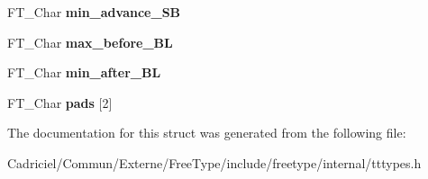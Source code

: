 \begin{DoxyCompactItemize}
\item 
F\+T\+\_\+\+Char {\bfseries min\+\_\+advance\+\_\+\+SB}\hypertarget{struct_t_t___s_bit___line_metrics_rec___ad4f4578a99ce4537bd454bf47a60074c}{}\label{struct_t_t___s_bit___line_metrics_rec___ad4f4578a99ce4537bd454bf47a60074c}

\item 
F\+T\+\_\+\+Char {\bfseries max\+\_\+before\+\_\+\+BL}\hypertarget{struct_t_t___s_bit___line_metrics_rec___a63599b9adfc64d1927b6a8b46d9ce08d}{}\label{struct_t_t___s_bit___line_metrics_rec___a63599b9adfc64d1927b6a8b46d9ce08d}

\item 
F\+T\+\_\+\+Char {\bfseries min\+\_\+after\+\_\+\+BL}\hypertarget{struct_t_t___s_bit___line_metrics_rec___a553dfe17d98fd138430545f4f77195c5}{}\label{struct_t_t___s_bit___line_metrics_rec___a553dfe17d98fd138430545f4f77195c5}

\item 
F\+T\+\_\+\+Char {\bfseries pads} \mbox{[}2\mbox{]}\hypertarget{struct_t_t___s_bit___line_metrics_rec___a9f98e5de39f252b6ebfb3e94120d1dbc}{}\label{struct_t_t___s_bit___line_metrics_rec___a9f98e5de39f252b6ebfb3e94120d1dbc}

\end{DoxyCompactItemize}


The documentation for this struct was generated from the following file\+:\begin{DoxyCompactItemize}
\item 
Cadriciel/\+Commun/\+Externe/\+Free\+Type/include/freetype/internal/tttypes.\+h\end{DoxyCompactItemize}
